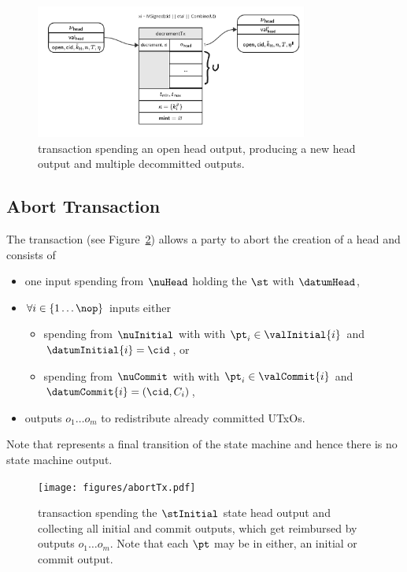\begin{figure}[h] \centering
	\includegraphics[width=0.8\textwidth]{figures/decrementTx.pdf}
	\caption{\mtxDecrement{} transaction spending an open head output,
		producing a new head output and multiple decommitted outputs.}\label{fig:decrementTx}
\end{figure}

\subsection{Abort Transaction}\label{sec:abort-tx}

The \mtxAbort{} transaction (see Figure~\ref{fig:abortTx}) allows a
party to abort the creation of a head and consists of
\begin{itemize}
	\item one input spending from $\nuHead$ holding the $\st$ with $\datumHead$,
	\item $\forall i \in \{1 \dots \nop\}$ inputs either
	      \begin{itemize}
		      \item spending from $\nuInitial$ with with $\pt_{i} \in \valInitial{i}$ and $\datumInitial{i} = \cid$, or
		      \item spending from $\nuCommit$ with with $\pt_{i} \in \valCommit{i}$ and $\datumCommit{i} = (\cid, C_{i})$,
	      \end{itemize}
	\item outputs $o_{1} \dots o_{m}$ to redistribute already committed UTxOs.
\end{itemize}

Note that \mtxAbort{} represents a final transition of the state
machine and hence there is no state machine output.

\begin{figure}[h]
	\centering
	\texttt{[image: figures/abortTx.pdf]}
	\caption{\mtxAbort{} transaction spending the $\stInitial$ state head
		output and collecting all initial and commit outputs, which get reimbursed
		by outputs $o_{1} \dots o_{m}$. Note that each $\pt$ may be in either, an
		initial or commit output.}\label{fig:abortTx}
\end{figure}

